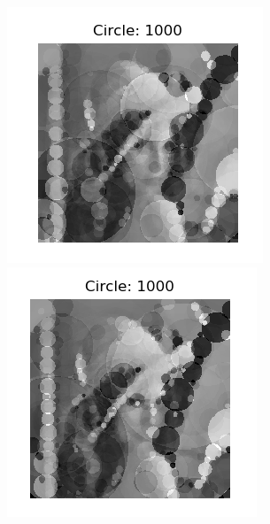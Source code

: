 \documentclass[12pt]{article}
\begin{document}
\begin{figure}[H]
\noindent\includegraphics[width=\textwidth/6]{../results/lenna/lenna_gen75}
\noindent\includegraphics[width=\textwidth/6]{../results/lenna/lenna_gen100}

\end{figure}
\end{document}

